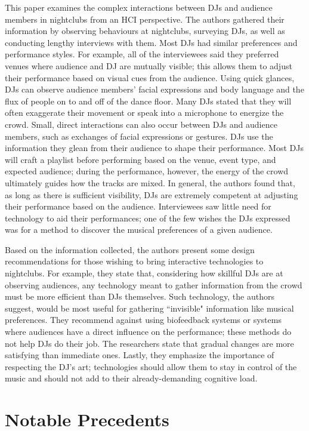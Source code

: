 This paper examines the complex interactions between DJs and audience members in nightclubs from an HCI perspective. The authors gathered their information by observing behaviours at nightclubs, surveying DJs, as well as conducting lengthy interviews with them. Most DJs had similar preferences and performance styles. For example, all of the interviewees said they preferred venues where audience and DJ are mutually visible; this allows them to adjust their performance based on visual cues from the audience. Using quick glances, DJs can observe audience members' facial expressions and body language and the flux of people on to and off of the dance floor. Many DJs stated that they will often exaggerate their movement or speak into a microphone to energize the crowd. Small, direct interactions can also occur between DJs and audience members, such as exchanges of facial expressions or gestures. DJs use the information they glean from their audience to shape their performance. Most DJs will craft a playlist before performing based on the venue, event type, and expected audience; during the performance, however, the energy of the crowd ultimately guides how the tracks are mixed. In general, the authors found that, as long as there is sufficient visibility, DJs are extremely competent at adjusting their performance based on the audience. Interviewees saw little need for technology to aid their performances; one of the few wishes the DJs expressed was for a method to discover the musical preferences of a given audience.

Based on the information collected, the authors present some design recommendations for those wishing to bring interactive technologies to nightclubs. For example, they state that, considering how skillful DJs are at observing audiences, any technology meant to gather information from the crowd must be more efficient than DJs themselves. Such technology, the authors suggest, would be most useful for gathering ``invisible" information like musical preferences. They recommend against using biofeedback systems or systems where audiences have a direct influence on the performance; these methods do not help DJs do their job. The researchers state that gradual changes are more satisfying than immediate ones. Lastly, they emphasize the importance of respecting the DJ's art; technologies should allow them to stay in control of the music and should not add to their already-demanding cognitive load.


\section{Notable Precedents}


